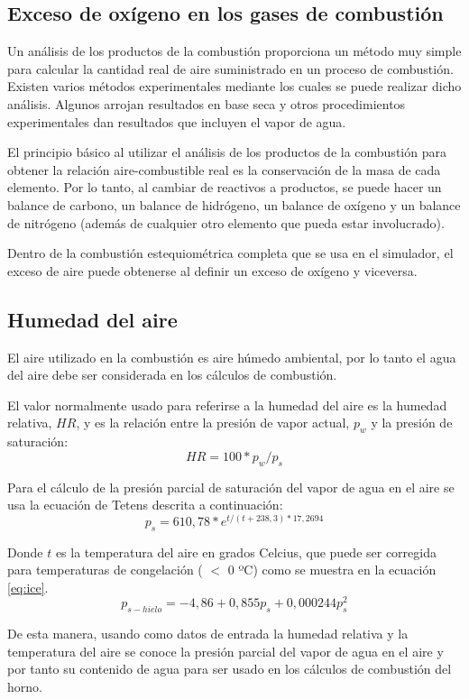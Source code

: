 \subsection{Exceso de oxígeno en los gases de combustión}
\par Un análisis de los productos de la combustión proporciona un método muy simple para calcular la cantidad real de aire suministrado en un proceso de combustión. Existen varios métodos experimentales mediante los cuales se puede realizar dicho análisis. Algunos arrojan resultados en base seca y otros procedimientos experimentales dan resultados que incluyen el vapor de agua. 
\par El principio básico al utilizar el análisis de los productos de la combustión para obtener la relación aire-combustible real es la conservación de la masa de cada elemento. Por lo tanto, al cambiar de reactivos a productos, se puede hacer un balance de carbono, un balance de hidrógeno, un balance de oxígeno y un balance de nitrógeno (además de cualquier otro elemento que pueda estar involucrado).
\par Dentro de la combustión estequiométrica completa que se usa en el simulador, el exceso de aire puede obtenerse al definir un exceso de oxígeno y viceversa. 

\subsection{Humedad del aire}
\par El aire utilizado en la combustión es aire húmedo ambiental, por lo tanto el agua del aire debe ser considerada en los cálculos de combustión.
\par El valor normalmente usado para referirse a la humedad del aire es la humedad relativa, $HR$, y es la relación entre la presión de vapor actual, $p_w$ y la presión de saturación:
\begin{equation}
    HR = 100 * p_w/p_s
\end{equation}
\par Para el cálculo de la presión parcial de saturación del vapor de agua en el aire se usa la ecuación de Tetens \cite{bib:tetens} descrita a continuación:
\begin{equation}
    p_s = 610,78 * e^{t/(t +238,3)*17,2694}
\end{equation}
\par Donde $t$ es la temperatura del aire en grados Celcius, que puede ser corregida para temperaturas de congelación ( $<$ 0 ºC) como se muestra en la ecuación \ref{eq:ice}.
\begin{equation}
\label{eq:ice}
    p_{s-hielo} = -4,86 + 0,855p_s + 0,000244p_s^2
\end{equation}
\par De esta manera, usando como datos de entrada la humedad relativa y la temperatura del aire se conoce la presión parcial del vapor de agua en el aire y por tanto su contenido de agua para ser usado en los cálculos de combustión del horno.

